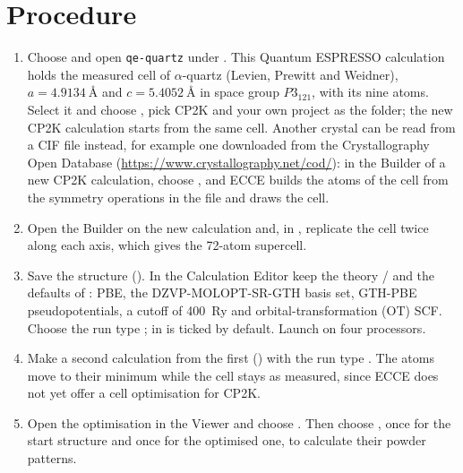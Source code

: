 \section{Procedure}
\begin{enumerate}
	\item Choose  and open \texttt{qe-quartz} under . This Quantum ESPRESSO calculation holds the measured cell of $\alpha$-quartz (Levien, Prewitt and Weidner), $a = \SI{4.9134}{\angstrom}$ and $c = \SI{5.4052}{\angstrom}$ in space group $P3_121$, with its nine atoms. Select it and choose , pick CP2K and your own project as the folder; the new CP2K calculation starts from the same cell. 
	Another crystal can be read from a CIF file instead, for example one downloaded from the Crystallography Open Database (\url{https://www.crystallography.net/cod/}): in the Builder of a new CP2K calculation, choose , and ECCE builds the atoms of the cell from the symmetry operations in the file and draws the cell.
	\item Open the Builder on the new calculation and, in , replicate the cell twice along each axis, which gives the 72-atom supercell. 
	\item Save the structure (). In the Calculation Editor keep the theory  /  and the defaults of : PBE, the DZVP-MOLOPT-SR-GTH basis set, GTH-PBE pseudopotentials, a cutoff of 400~Ry and orbital-transformation (OT) SCF. Choose the run type ;  in  is ticked by default. Launch on four processors.
	\item Make a second calculation from the first () with the run type . The atoms move to their minimum while the cell stays as measured, since ECCE does not yet offer a cell optimisation for CP2K.
	\item Open the optimisation in the Viewer and choose . Then choose , once for the start structure and once for the optimised one, to calculate their powder patterns.
\end{enumerate}

